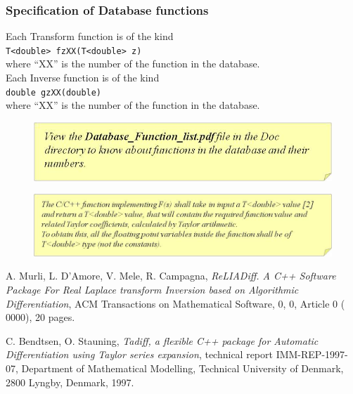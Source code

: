 \documentclass[10pt]{article}
\begin{document}
\subsubsection{Specification of Database functions}

Each Transform function is of the kind\\
{\tt T<double>  fzXX(T<double> z)} \\
where “XX” is the number of the function in the database.\\

Each Inverse function is of the kind\\
{\tt double gzXX(double)}\\
where “XX” is the number of the function in the database.\\

 \begin{figure}[!h]
\begin{flushright}

\includegraphics[scale=0.8]{Immagine15}
\end{flushright}
\end{figure}

\begin{figure}[!h]
\begin{flushright}

\includegraphics[scale=0.8]{Immagine16}
\end{flushright}
\end{figure}

\newpage

\begin{thebibliography}{10}
 A. Murli, L. D'Amore, V. Mele, R. Campagna, \emph{ReLIADiff. A C++ Software Package For Real Laplace
transform Inversion based on Algorithmic Differentiation}, ACM Transactions on Mathematical Software,
0, 0, Article 0 ( 0000), 20 pages.

 C. Bendtsen, O. Stauning, \emph{ Tadiff, a flexible C++ package for Automatic Differentiation using Taylor series expansion}, technical report IMM-REP-1997-07, Department of Mathematical Modelling, Technical University of Denmark, 2800 Lyngby, Denmark, 1997.

\end{thebibliography}
\end{document}
